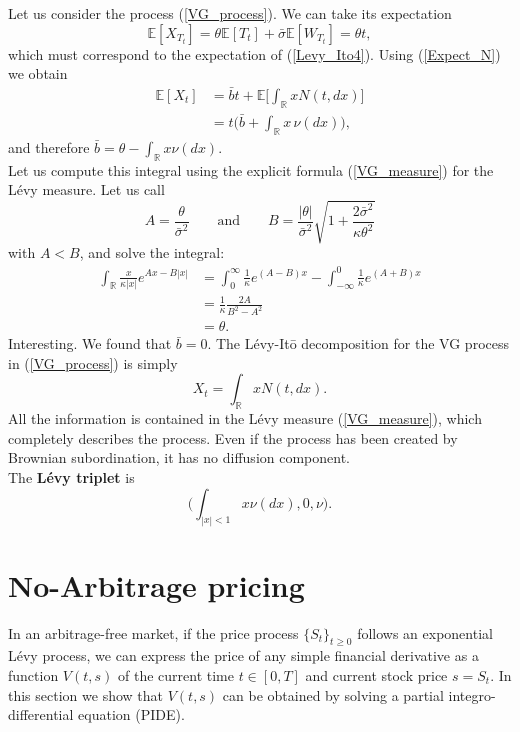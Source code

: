 \documentclass[a4paper,10pt]{article}
\newcommand{\numberset}{\mathbb}
\newcommand{\R}{\numberset{R}}
\newcommand{\E}{\numberset{E}}
\begin{document}
\noindent Let us consider the process (\ref{VG_process}). We can take its expectation 
$$\E[X_{T_t}] = \theta \E[T_t] + \bar\sigma \E[W_{T_t}] = \theta t,$$ 
which must correspond to the expectation of (\ref{Levy_Ito4}). Using (\ref{Expect_N}) we obtain
\begin{align}
 \E[X_t] &= \bar b t + \E \biggl[ \int_{\R} x N(t,dx)\biggr] \\ \nonumber
	  &= t \biggl( \bar b + \int_{\R} x \, \nu(dx) \biggr), \nonumber
\end{align}
and therefore $ \bar b = \theta - \int_{\R} x \nu(dx) $.\\
Let us compute this integral using the explicit formula (\ref{VG_measure}) for the Lévy measure.
Let us call $$A = \frac{\theta}{\bar\sigma^2} \hspace{2em} \mbox{and} \hspace{2em} 
B=\frac{|\theta|}{\bar\sigma^2}\sqrt{1+\frac{2\bar\sigma^2}{\kappa \theta^2}}$$
with $A<B$, and solve the integral:
\begin{align*}
 \int_{\R} \frac{x}{\kappa |x|} e^{Ax-B|x|} &= \int_{0}^{\infty} \frac{1}{\kappa} e^{(A-B)x} 
 - \int_{-\infty}^0 \frac{1}{\kappa} e^{(A+B)x} \\
 &= \frac{1}{\kappa} \frac{2A}{B^2-A^2} \\
 &= \theta.
\end{align*}
Interesting. We found that $\bar b = 0$.
The Lévy-It\={o} decomposition for the VG process in (\ref{VG_process}) is simply
\begin{equation}
X_t = \int_{\R} x N(t,dx). 
\end{equation}
All the information is contained in the Lévy measure (\ref{VG_measure}),
which completely describes the process. Even if the process has been created by Brownian
subordination, it has no diffusion component. \\ 
The \textbf{L\'evy triplet} is
\begin{equation}\label{VG_triplet}
 \biggl( \int_{|x|<1} x \nu(dx), 0, \nu \biggr).
\end{equation}



\section{No-Arbitrage pricing}

In an arbitrage-free market, if the price process $\{S_t\}_{t\geq0}$ follows an exponential Lévy process, 
we can express the price of any simple financial derivative as a function $V(t,s)$ of the current time 
$t \in [0,T]$ and current stock price $s=S_t$.
In this section we show that $V(t,s)$ can be obtained by solving a partial integro-differential equation (PIDE).
\end{document}
